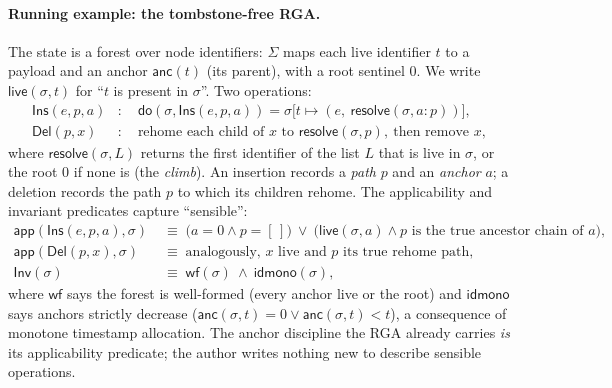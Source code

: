 \documentclass[11pt]{article}
\newcommand{\dolab}{\mathsf{do}}
\newcommand{\Inv}{\mathsf{Inv}}
\newcommand{\app}{\mathsf{app}}
\newcommand{\resolve}{\mathsf{resolve}}
\newcommand{\anc}{\mathsf{anc}}
\newcommand{\live}{\mathsf{live}}
\newcommand{\Ins}{\mathsf{Ins}}
\newcommand{\Del}{\mathsf{Del}}
\begin{document}
\paragraph{Running example: the tombstone-free RGA.}
The state is a forest over node identifiers: $\Sigma$ maps each live identifier
$t$ to a payload and an anchor $\anc(t)$ (its parent), with a root sentinel $0$.
We write $\live(\sigma,t)$ for ``$t$ is present in $\sigma$''. Two operations:
\begin{align*}
  \Ins(e,p,a)&:\quad \dolab(\sigma,\Ins(e,p,a)) = \sigma\big[t \mapsto (e,\
    \resolve(\sigma, a\!:\!p))\big], \\
  \Del(p,x)&:\quad \text{rehome each child of $x$ to } \resolve(\sigma,p),\
    \text{then remove } x,
\end{align*}
where $\resolve(\sigma,L)$ returns the first identifier of the list $L$ that is
live in $\sigma$, or the root $0$ if none is (the \emph{climb}). An insertion
records a \emph{path} $p$ and an \emph{anchor} $a$; a deletion records the path
$p$ to which its children rehome. The applicability and invariant predicates
capture ``sensible'':
\begin{align*}
  \app(\Ins(e,p,a),\sigma) &\;\equiv\; \big(a=0 \wedge p=[\,]\big)\ \vee\
    \big(\live(\sigma,a)\wedge \text{$p$ is the true ancestor chain of $a$}\big),\\
  \app(\Del(p,x),\sigma) &\;\equiv\; \text{analogously, $x$ live and $p$ its
    true rehome path},\\
  \Inv(\sigma) &\;\equiv\; \mathsf{wf}(\sigma)\ \wedge\ \mathsf{idmono}(\sigma),
\end{align*}
where $\mathsf{wf}$ says the forest is well-formed (every anchor live or the
root) and $\mathsf{idmono}$ says anchors strictly decrease
($\anc(\sigma,t)=0 \vee \anc(\sigma,t)<t$), a consequence of monotone timestamp
allocation. The anchor discipline the RGA already carries \emph{is} its
applicability predicate; the author writes nothing new to describe sensible
operations.
\end{document}
